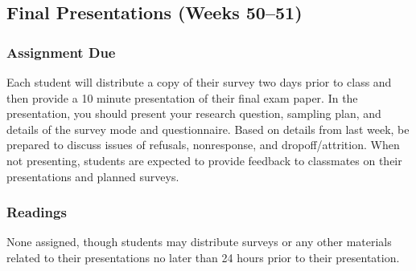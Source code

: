 \documentclass[11pt,a4paper]{article}
\newcommand{\seealso}{\noindent \emph{See Also:}\\}
\begin{document}



\clearpage
\subsection{Final Presentations (Weeks 50--51)}
\vspace{1em}
\subsubsection*{Assignment Due}
Each student will distribute a copy of their survey two days prior to class and then provide a 10 minute presentation of their final exam paper. In the presentation, you should present your research question, sampling plan, and details of the survey mode and questionnaire. Based on details from last week, be prepared to discuss issues of refusals, nonresponse, and dropoff/attrition. When not presenting, students are expected to provide feedback to classmates on their presentations and planned surveys.

\subsubsection*{Readings}
None assigned, though students may distribute surveys or any other materials related to their presentations no later than 24 hours prior to their presentation.




\end{document}

